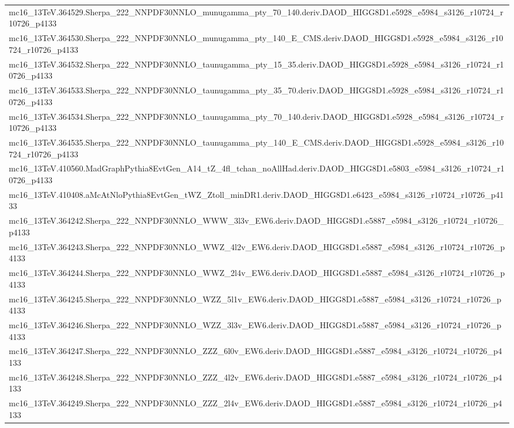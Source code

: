 \begin{adjustwidth}{-3em}{-3em}
\begin{longtable}{l}
mc16\_13TeV.364529.Sherpa\_222\_NNPDF30NNLO\_munugamma\_pty\_70\_140.deriv.DAOD\_HIGG8D1.e5928\_e5984\_s3126\_r10724\_r10726\_p4133 \\
mc16\_13TeV.364530.Sherpa\_222\_NNPDF30NNLO\_munugamma\_pty\_140\_E\_CMS.deriv.DAOD\_HIGG8D1.e5928\_e5984\_s3126\_r10724\_r10726\_p4133 \\
mc16\_13TeV.364532.Sherpa\_222\_NNPDF30NNLO\_taunugamma\_pty\_15\_35.deriv.DAOD\_HIGG8D1.e5928\_e5984\_s3126\_r10724\_r10726\_p4133 \\
mc16\_13TeV.364533.Sherpa\_222\_NNPDF30NNLO\_taunugamma\_pty\_35\_70.deriv.DAOD\_HIGG8D1.e5928\_e5984\_s3126\_r10724\_r10726\_p4133 \\
mc16\_13TeV.364534.Sherpa\_222\_NNPDF30NNLO\_taunugamma\_pty\_70\_140.deriv.DAOD\_HIGG8D1.e5928\_e5984\_s3126\_r10724\_r10726\_p4133 \\
mc16\_13TeV.364535.Sherpa\_222\_NNPDF30NNLO\_taunugamma\_pty\_140\_E\_CMS.deriv.DAOD\_HIGG8D1.e5928\_e5984\_s3126\_r10724\_r10726\_p4133 \\
mc16\_13TeV.410560.MadGraphPythia8EvtGen\_A14\_tZ\_4fl\_tchan\_noAllHad.deriv.DAOD\_HIGG8D1.e5803\_e5984\_s3126\_r10724\_r10726\_p4133 \\
mc16\_13TeV.410408.aMcAtNloPythia8EvtGen\_tWZ\_Ztoll\_minDR1.deriv.DAOD\_HIGG8D1.e6423\_e5984\_s3126\_r10724\_r10726\_p4133 \\
mc16\_13TeV.364242.Sherpa\_222\_NNPDF30NNLO\_WWW\_3l3v\_EW6.deriv.DAOD\_HIGG8D1.e5887\_e5984\_s3126\_r10724\_r10726\_p4133 \\
mc16\_13TeV.364243.Sherpa\_222\_NNPDF30NNLO\_WWZ\_4l2v\_EW6.deriv.DAOD\_HIGG8D1.e5887\_e5984\_s3126\_r10724\_r10726\_p4133 \\
mc16\_13TeV.364244.Sherpa\_222\_NNPDF30NNLO\_WWZ\_2l4v\_EW6.deriv.DAOD\_HIGG8D1.e5887\_e5984\_s3126\_r10724\_r10726\_p4133 \\
mc16\_13TeV.364245.Sherpa\_222\_NNPDF30NNLO\_WZZ\_5l1v\_EW6.deriv.DAOD\_HIGG8D1.e5887\_e5984\_s3126\_r10724\_r10726\_p4133 \\
mc16\_13TeV.364246.Sherpa\_222\_NNPDF30NNLO\_WZZ\_3l3v\_EW6.deriv.DAOD\_HIGG8D1.e5887\_e5984\_s3126\_r10724\_r10726\_p4133 \\
mc16\_13TeV.364247.Sherpa\_222\_NNPDF30NNLO\_ZZZ\_6l0v\_EW6.deriv.DAOD\_HIGG8D1.e5887\_e5984\_s3126\_r10724\_r10726\_p4133 \\
mc16\_13TeV.364248.Sherpa\_222\_NNPDF30NNLO\_ZZZ\_4l2v\_EW6.deriv.DAOD\_HIGG8D1.e5887\_e5984\_s3126\_r10724\_r10726\_p4133 \\
mc16\_13TeV.364249.Sherpa\_222\_NNPDF30NNLO\_ZZZ\_2l4v\_EW6.deriv.DAOD\_HIGG8D1.e5887\_e5984\_s3126\_r10724\_r10726\_p4133 \\

\end{longtable}
\end{adjustwidth}
